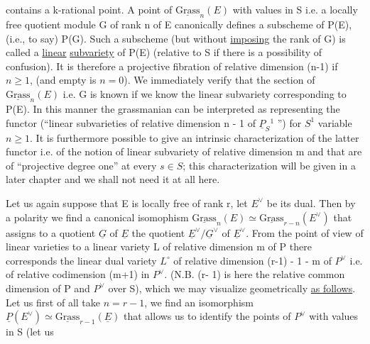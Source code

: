 
contains a k-rational point.  A point of $\underline{\mathrm{Grass}}_{n}(E)$ with values in S
i.e. a locally free quotient module G of rank n of E canonically
defines a subscheme of P(E), (i.e., to say) P(G).  Such a
subscheme (but without \uline{imposing} the rank of G) is called a \uline{linear}
\uline{subvariety} of P(E) (relative to S if there is a possibility of
confusion).  It is therefore a projective fibration of relative
dimension (n-1) if $n \geq 1$, (and empty is $n = 0$).  We immediately
verify that the section of $\underline{\mathrm{Grass}}_{n}(E)$ i.e. G is known if we know the
linear subvariety corresponding to P(E).  In this manner the
grassmanian can be interpreted as representing the functor
(``linear subvarieties of relative dimension n - 1 of $\underline{P}_{S}{}^{1}$ '') for $S^{1}$
variable $n \geq 1$.  It is furthermore possible to give an intrinsic
characterization of the latter functor i.e. of the notion of
linear subvariety of relative dimension m and that are of
``projective degree one'' at every $s \in S$; this characterization will
be given in a later chapter and we shall not need it at all here.

Let us again suppose that E is locally free of rank r, let $E^{\vee}$
be its dual.  Then by a polarity we find a canonical isomophism
$\underline{\mathrm{Grass}}_{n}(E) \simeq \underline{\mathrm{Grass}}_{r-n}(E^{\vee})$ that assigns to a quotient $\underline{G}$ of $\underline{E}$ the
quotient $\underline{E}^{\vee}/\underline{G}^{\vee}$ of $\underline{E}^{\vee}$.  From the point of view of linear varieties
to a linear variety L of relative dimension m of P there
corresponds the linear dual variety $L^{\circ}$ of relative dimension (r-1)
- 1 - m of $P^{\vee}$ i.e. of relative codimension (m+1) in $P^{\vee}$.  (N.B. (r-%
1) is here the relative common dimension of P and $P^{\vee}$ over S), which
we may visualize geometrically \uline{as follows}.  Let us first of all
take $n = r - 1$, we find an isomorphism $\underline{P}(E^{\vee}) \simeq \underline{\mathrm{Grass}}_{r-1}(\underline{E})$ that
allows us to identify the points of $P^{\vee}$ with values in S (let us
